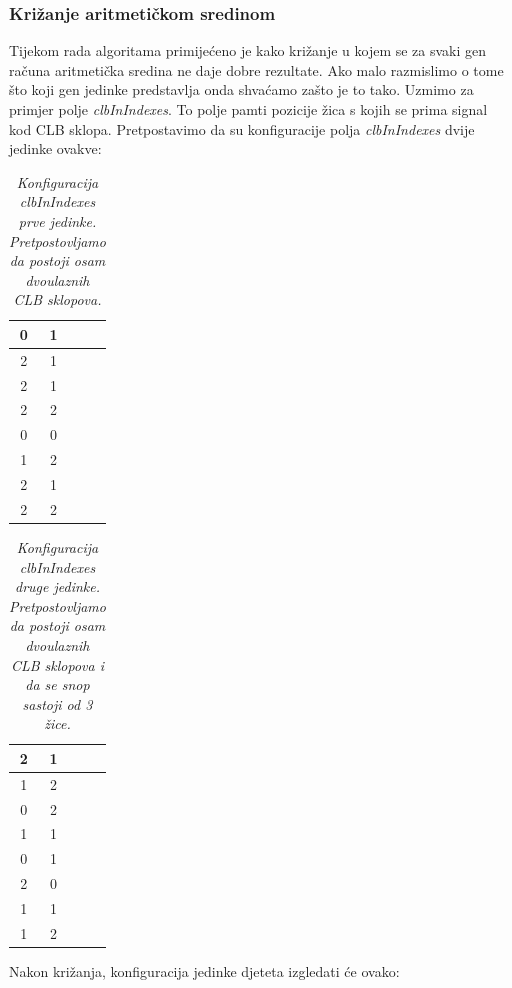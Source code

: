 \documentclass[times, utf8, zavrsni]{fer}
\begin{document}
	\subsubsection{Križanje aritmetičkom sredinom}
	
	
	Tijekom rada algoritama primijećeno je kako križanje u kojem se za svaki gen računa aritmetička sredina ne daje dobre rezultate. Ako malo razmislimo o tome što koji gen jedinke predstavlja onda shvaćamo zašto je to tako. Uzmimo za primjer polje \emph{clbInIndexes}. To polje pamti pozicije žica s kojih se prima signal kod CLB sklopa. Pretpostavimo da su konfiguracije polja \emph{clbInIndexes} dvije jedinke ovakve:
	
	\begin{table}[H]
		\caption{\emph{Konfiguracija \emph{clbInIndexes} prve jedinke. Pretpostovljamo da postoji osam dvoulaznih CLB sklopova.}}
		\label{chromoClbIndex1}
		\centering
		\begin{tabular}{|c|c|c|c|} \hline
			0 & 1 \\ \hline
			2 & 1 \\ \hline
			2 & 1 \\ \hline
			2 & 2 \\ \hline
			0 & 0 \\ \hline
			1 & 2 \\ \hline
			2 & 1 \\ \hline
			2 & 2 \\ \hline
		\end{tabular}
	\end{table}
	
	\begin{table}[H]
		\caption{\emph{Konfiguracija \emph{clbInIndexes} druge jedinke. Pretpostovljamo da postoji osam dvoulaznih CLB sklopova i da se snop sastoji od 3 žice. }}
		\label{chromoClbIndex2}
		\centering
		\begin{tabular}{|c|c|c|c|} \hline
			2 & 1 \\ \hline
			1 & 2 \\ \hline
			0 & 2 \\ \hline
			1 & 1 \\ \hline
			0 & 1 \\ \hline
			2 & 0 \\ \hline
			1 & 1 \\ \hline
			1 & 2 \\ \hline
		\end{tabular}
	\end{table} 
	
	Nakon križanja, konfiguracija jedinke djeteta izgledati će ovako:
	
\end{document}
